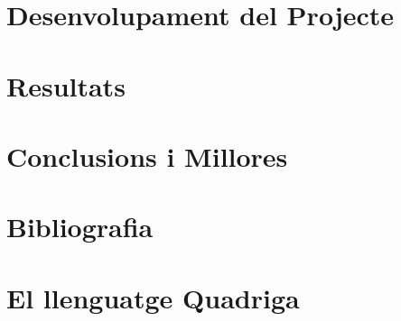 \documentclass{article}
\begin{document}




\newpage
\tableofcontents



\newpage
\section{Desenvolupament del Projecte}

\newpage
\section{Resultats}

\newpage
\section{Conclusions i Millores}

\newpage
\section{Bibliografia}

\appendix
\newpage
\section{El llenguatge Quadriga}
\end{document}
